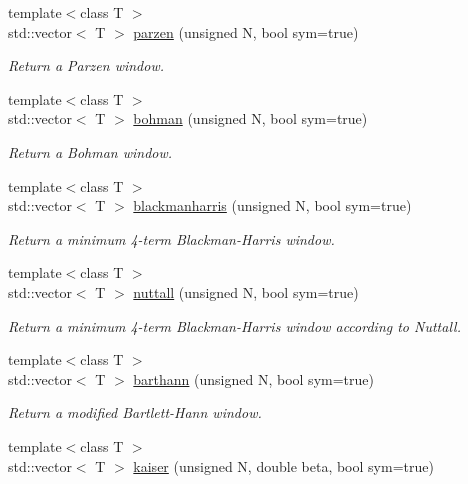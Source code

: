 \begin{DoxyCompactItemize}
{\footnotesize template$<$class T $>$ }\\std\+::vector$<$ T $>$ \mbox{\hyperlink{namespacedsp_1_1window_a479dc86ffddf5e19d595c0c0e751edda}{parzen}} (unsigned N, bool sym=true)
\begin{DoxyCompactList}\small\item\em Return a Parzen window. \end{DoxyCompactList}\item 
{\footnotesize template$<$class T $>$ }\\std\+::vector$<$ T $>$ \mbox{\hyperlink{namespacedsp_1_1window_a72327b8f54fe769b2345389ddab7f575}{bohman}} (unsigned N, bool sym=true)
\begin{DoxyCompactList}\small\item\em Return a Bohman window. \end{DoxyCompactList}\item 
{\footnotesize template$<$class T $>$ }\\std\+::vector$<$ T $>$ \mbox{\hyperlink{namespacedsp_1_1window_a942b43c2d1291dc4216a971b594a4fcf}{blackmanharris}} (unsigned N, bool sym=true)
\begin{DoxyCompactList}\small\item\em Return a minimum 4-\/term Blackman-\/\+Harris window. \end{DoxyCompactList}\item 
{\footnotesize template$<$class T $>$ }\\std\+::vector$<$ T $>$ \mbox{\hyperlink{namespacedsp_1_1window_a28c5c4d7e81acce1c360013c1a3f2fc9}{nuttall}} (unsigned N, bool sym=true)
\begin{DoxyCompactList}\small\item\em Return a minimum 4-\/term Blackman-\/\+Harris window according to Nuttall. \end{DoxyCompactList}\item 
{\footnotesize template$<$class T $>$ }\\std\+::vector$<$ T $>$ \mbox{\hyperlink{namespacedsp_1_1window_a706a651f4fc7da094026b341f20138bb}{barthann}} (unsigned N, bool sym=true)
\begin{DoxyCompactList}\small\item\em Return a modified Bartlett-\/\+Hann window. \end{DoxyCompactList}\item 
{\footnotesize template$<$class T $>$ }\\std\+::vector$<$ T $>$ \mbox{\hyperlink{namespacedsp_1_1window_a84fcea5f41eba58cf50df8569e2ac290}{kaiser}} (unsigned N, double beta, bool sym=true)

\end{DoxyCompactItemize}
